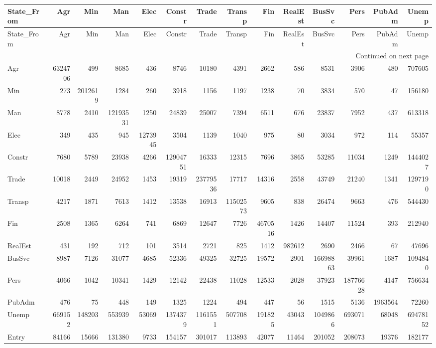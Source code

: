 \begin{longtable}{lrrrrrrrrrrrrr}
\toprule
State_From & Agr & Min & Man & Elec & Constr & Trade & Transp & Fin & RealEst & BusSvc & Pers & PubAdm & Unemp \\
\midrule
\endfirsthead
\toprule
State_From & Agr & Min & Man & Elec & Constr & Trade & Transp & Fin & RealEst & BusSvc & Pers & PubAdm & Unemp \\
\midrule
\endhead
\midrule
\multicolumn{14}{r}{Continued on next page} \\
\midrule
\endfoot
\bottomrule
\endlastfoot
Agr & 6324706 & 499 & 8685 & 436 & 8746 & 10180 & 4391 & 2662 & 586 & 8531 & 3906 & 480 & 707605 \\
Min & 273 & 2012619 & 1284 & 260 & 3918 & 1156 & 1197 & 1238 & 70 & 3834 & 570 & 47 & 156180 \\
Man & 8778 & 2410 & 12193531 & 1250 & 24839 & 25007 & 7394 & 6511 & 676 & 23837 & 7952 & 437 & 613318 \\
Elec & 349 & 435 & 945 & 1273945 & 3504 & 1139 & 1040 & 975 & 80 & 3034 & 972 & 114 & 55357 \\
Constr & 7680 & 5789 & 23938 & 4266 & 12904751 & 16333 & 12315 & 7696 & 3865 & 53285 & 11034 & 1249 & 1444027 \\
Trade & 10018 & 2449 & 24952 & 1453 & 19319 & 23779536 & 17717 & 14316 & 2558 & 43749 & 21240 & 1341 & 1297190 \\
Transp & 4217 & 1871 & 7613 & 1412 & 13538 & 16913 & 11502573 & 9605 & 838 & 26474 & 9663 & 476 & 544430 \\
Fin & 2508 & 1365 & 6264 & 741 & 6869 & 12647 & 7726 & 4670516 & 1426 & 14407 & 11524 & 393 & 212940 \\
RealEst & 431 & 192 & 712 & 101 & 3514 & 2721 & 825 & 1412 & 982612 & 2690 & 2466 & 67 & 47696 \\
BusSvc & 8987 & 7126 & 31077 & 4685 & 52336 & 49325 & 32725 & 19572 & 2901 & 16698863 & 39961 & 1687 & 1094840 \\
Pers & 4066 & 1042 & 10341 & 1429 & 12142 & 22438 & 11028 & 12533 & 2028 & 37923 & 18776628 & 4147 & 756634 \\
PubAdm & 476 & 75 & 448 & 149 & 1325 & 1224 & 494 & 447 & 56 & 1515 & 5136 & 1963564 & 72260 \\
Unemp & 669152 & 148203 & 553939 & 53069 & 1374379 & 1161551 & 507708 & 191825 & 43043 & 1049866 & 693071 & 68048 & 69478152 \\
Entry & 84166 & 15666 & 131380 & 9733 & 154157 & 301017 & 113893 & 42077 & 11464 & 201052 & 208073 & 19376 & 182177 \\
\end{longtable}
